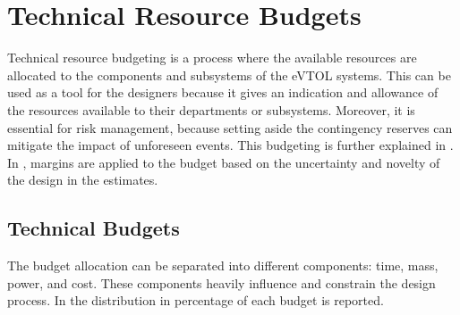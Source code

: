 \chapter{Technical Resource Budgets}
\label{chap:TechnicalResourceBudgets}
Technical resource budgeting is a process where the available resources are allocated to the components and subsystems of the eVTOL systems.
This can be used as a tool for the designers because it gives an indication and allowance of the resources available to their departments or subsystems.
Moreover, it is essential for risk management, because setting aside the contingency reserves can mitigate the impact of unforeseen events.
This budgeting is further explained in .
In , margins are applied to the budget based on the uncertainty and novelty of the design in the estimates.



\section{Technical Budgets}
\label{sec:techbudget}
The budget allocation can be separated into different components: time, mass, power, and cost.
These components heavily influence and constrain the design process.
In  the distribution in percentage of each budget is reported.


